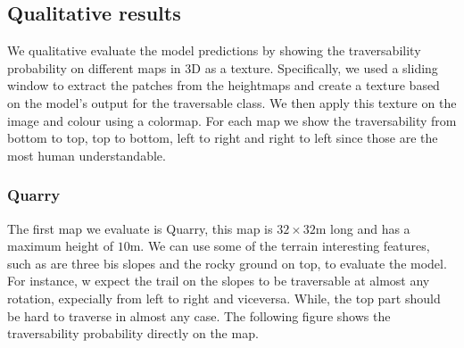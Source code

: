 \documentclass[../document.tex]{subfiles}
\begin{document}
\subsection{Qualitative results}
We qualitative evaluate the model predictions by showing the traversability probability on different maps in 3D as a texture. Specifically, we used a sliding window to extract the patches from the heightmaps and create a texture based on the model's output for the traversable class. We then apply this texture on the image and colour using a colormap. For each map we show the traversability from bottom to top, top to bottom, left to right and right to left since those are the most human understandable.
\subsubsection{Quarry}
The first map we evaluate is Quarry, this map is $32\times 32$m long and has a maximum height of $10$m. We can use some of the terrain interesting features, such as are three bis slopes and the rocky ground on top, to evaluate the model. For instance, w expect the trail on the slopes to be traversable at almost any rotation, expecially from left to right and viceversa. While, the top part should be hard to traverse in almost any case. The following figure shows the traversability probability directly on the map. 
\end{document}
